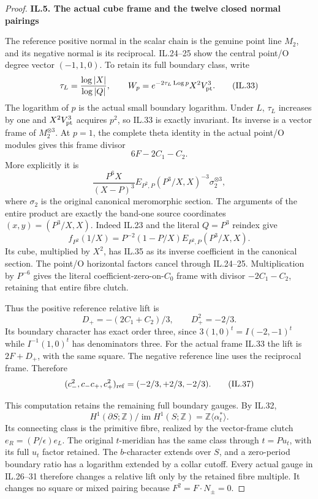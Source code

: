 \begin{proof}
\par

\medskip\noindent\textbf{IL.5. The actual cube frame and the twelve closed normal pairings}

\par\nobreak

The reference positive normal in the scalar chain is the
genuine point line \(M_2\), and its negative normal is
its reciprocal. IL.24--25 show the central point/O degree
vector \((-1,1,0)\). To retain its full boundary class,
write
\[
 \tau_L=\frac{\log|X|}{\log|Q|},\qquad
 W_p=e^{-2\tau_L\operatorname{Log}p}X^2V_{\rm pt}^3.
 \tag{IL.33}
\]
The logarithm of \(p\) is the actual small boundary logarithm.
Under \(L\), \(\tau_L\) increases by one and
\(X^2V_{\rm pt}^3\) acquires \(p^2\), so IL.33 is exactly
invariant. Its inverse is a vector frame of \(M_2^{\otimes3}\).
At \(p=1\), the complete theta identity in the actual
point/O modules gives this frame divisor
\[
                    6F-2C_1-C_2.
 \tag{IL.34}
\]
More explicitly it is
\[
 \frac{P^6X}{(X-P)^3}
       E_{P^2,P}(P^3/X,X)^{-3}\sigma_2^{\otimes3},
 \tag{IL.35}
\]
where \(\sigma_2\) is the original canonical meromorphic
section. The arguments of the entire product are exactly
the band-one source coordinates \((x,y)=(P^3/X,X)\).
Indeed IL.23 and the literal \(Q=P^3\) reindex give
\[
 f_{P^2}(1/X)
      =P^{-2}(1-P/X)E_{P^2,P}(P^3/X,X).
 \tag{IL.35a}
\]
Its cube, multiplied by \(X^2\), has IL.35 as its inverse
coefficient in the canonical section. The point/O horizontal factors cancel through
IL.24--25. Multiplication by \(P^{-6}\) gives the literal
coefficient-zero-on-\(C_0\) frame with divisor
\(-2C_1-C_2\), retaining that entire fibre clutch.

Thus the positive reference relative lift is
\[
 D_+=-(2C_1+C_2)/3,\qquad D_+^2=-2/3.
 \tag{IL.36}
\]
Its boundary character has exact order three, since
\(3(1,0)^t=I(-2,-1)^t\) while \(I^{-1}(1,0)^t\)
has denominators three. For the actual frame IL.33 the
lift is \(2F+D_+\), with the same square. The negative
reference line uses the reciprocal frame. Therefore
\[
 (c_-^2,c_-c_+,c_+^2)_{\rm ref}=(-2/3,+2/3,-2/3).
 \tag{IL.37}
\]

This computation retains the remaining full boundary gauges.
By IL.32,
\[
 H^1(\partial S;\mathbb Z)/\operatorname{im}H^1(S;\mathbb Z)
                    =\mathbb Z\langle\alpha_t^*\rangle.
 \tag{IL.38}
\]
Its connecting class is the primitive fibre, realized by
the vector-frame clutch \(e_R=(P/\epsilon)e_L\).
The original \(t\)-meridian has the same class through
\(t=Pu_t\), with its full \(u_t\) factor retained.
The \(b\)-character extends over \(S\), and a zero-period
boundary ratio has a logarithm extended by a collar cutoff.
Every actual gauge in IL.26--31 therefore changes a relative
lift only by the retained fibre multiple. It changes no
square or mixed pairing because \(F^2=F\cdot N_\pm=0\).


\end{proof}
